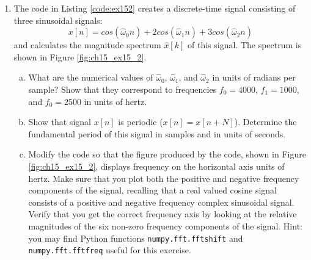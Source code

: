 \begin{enumerate}
\item The code in Listing \ref{code:ex152} creates a discrete-time signal consisting of three sinusoidal signals:
\begin{equation}
x[n]=cos(\hat{\omega}_0 n)+2cos(\hat{\omega}_1 n)+3cos(\hat{\omega}_2 n)
\label{eq:ex15_2}
\end{equation}
and calculates the magnitude spectrum $\hat{x}[k]$ of this signal. The spectrum is shown in Figure \ref{fig:ch15_ex15_2}.



\begin{enumerate}[a)]
    \item What are the numerical values of $\hat{\omega}_0$, $\hat{\omega}_1$, and $\hat{\omega}_2$ in units of radians per sample? Show that they correspond to frequencies $f_0=4000$, $f_1=1000$, and $f_0=2500$ in units of hertz.
    \item Show that signal $x[n]$ is periodic ($x[n]=x[n+N]$). Determine the fundamental period of this signal in samples and in units of seconds. 
    \item Modify the code so that the figure produced by the code, shown in Figure \ref{fig:ch15_ex15_2}, displays frequency on the horizontal axis units of hertz. Make sure that you plot both the positive and negative frequency components of the signal, recalling that a real valued cosine signal consists of a positive and negative frequency complex sinusoidal signal. Verify that you get the correct frequency axis by looking at the relative magnitudes of the six non-zero frequency components of the signal. Hint: you may find Python functions \verb|numpy.fft.fftshift| and \verb|numpy.fft.fftfreq| useful for this exercise.
\end{enumerate}



\end{enumerate}
